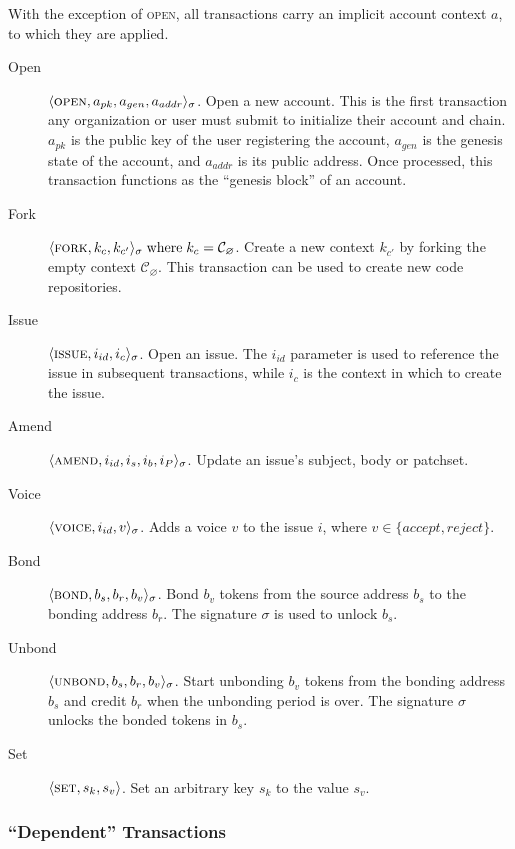 With the exception of \textsc{open}, all transactions carry an implicit account
context $a$, to which they are applied.

\begin{description}
    \item[Open] $\langle \text{\normalfont\scshape open}, a_{pk}, a_{gen}, a_{addr} \rangle_{\sigma}$.  Open a new
        account. This is the first transaction any organization or user must
        submit to initialize their account and chain.  $a_{pk}$ is the public
        key of the user registering the account, $a_{gen}$ is the genesis state
        of the account, and $a_{addr}$ is its public address.  Once processed,
        this transaction functions as the ``genesis block'' of an account.
    \item[Fork] $\langle \text{\normalfont\scshape fork}, k_c, k_{c'} \rangle_\sigma \; \text{where} \; k_c =
        \mathcal{C}_{\varnothing}$. Create a new context $k_{c'}$ by forking
        the empty context $\mathcal{C}_{\varnothing}$. This transaction can
        be used to create new code repositories.
    \item[Issue] $\langle \text{\normalfont\scshape issue}, i_{id}, i_{c} \rangle_\sigma$. Open an issue. The $i_{id}$
        parameter is used to reference the issue in subsequent transactions,
        while $i_c$ is the context in which to create the issue.
    \item[Amend] $\langle \text{\normalfont\scshape amend}, i_{id}, i_{s}, i_{b}, i_P \rangle_\sigma$.
        Update an issue's subject, body or patchset.
    \item[Voice] $\langle \text{\normalfont\scshape voice}, i_{id}, v \rangle_\sigma$.  Adds a voice $v$ to the issue
        $i$, where $v \in \{accept, reject\}$.
    \item[Bond] $\langle \text{\normalfont\scshape bond}, b_{s}, b_{r}, b_{v} \rangle_{\sigma}$. Bond $b_v$ tokens
        from the source address $b_{s}$ to the bonding address $b_r$. The
        signature $\sigma$ is used to unlock $b_s$.
    \item[Unbond] $\langle \text{\normalfont\scshape unbond}, b_{s}, b_{r}, b_{v} \rangle_{\sigma}$. Start unbonding
        $b_v$ tokens from the bonding address $b_{s}$ and credit $b_r$ when
        the unbonding period is over. The signature $\sigma$ unlocks the
        bonded tokens in $b_s$.
    \item[Set] $\langle \text{\normalfont\scshape set}, s_k, s_v \rangle$. Set an arbitrary key $s_k$ to the value
        $s_v$.
\end{description}

\subsubsection{``Dependent'' Transactions}

